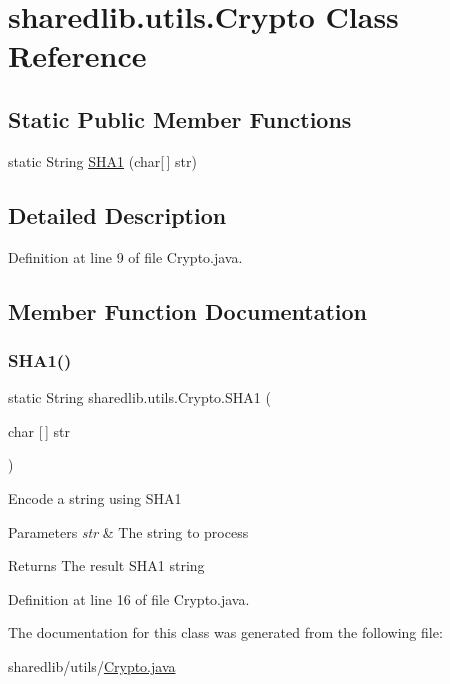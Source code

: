 \hypertarget{classsharedlib_1_1utils_1_1_crypto}{}\section{sharedlib.\+utils.\+Crypto Class Reference}
\label{classsharedlib_1_1utils_1_1_crypto}
\subsection*{Static Public Member Functions}
\begin{DoxyCompactItemize}
\item 
static String \hyperlink{classsharedlib_1_1utils_1_1_crypto_a0284de163e110b85f0b08b75bce3c4ce}{S\+H\+A1} (char\mbox{[}$\,$\mbox{]} str)
\end{DoxyCompactItemize}


\subsection{Detailed Description}


Definition at line 9 of file Crypto.\+java.



\subsection{Member Function Documentation}
\hypertarget{classsharedlib_1_1utils_1_1_crypto_a0284de163e110b85f0b08b75bce3c4ce}{}\label{classsharedlib_1_1utils_1_1_crypto_a0284de163e110b85f0b08b75bce3c4ce} 
\subsubsection{\texorpdfstring{S\+H\+A1()}{SHA1()}}
{\footnotesize\ttfamily static String sharedlib.\+utils.\+Crypto.\+S\+H\+A1 (\begin{DoxyParamCaption}\item[{char \mbox{[}$\,$\mbox{]}}]{str }\end{DoxyParamCaption})\hspace{0.3cm}{\ttfamily [static]}}

Encode a string using S\+H\+A1 
\begin{DoxyParams}{Parameters}
{\em str} & The string to process \\
\hline
\end{DoxyParams}
\begin{DoxyReturn}{Returns}
The result S\+H\+A1 string 
\end{DoxyReturn}


Definition at line 16 of file Crypto.\+java.



The documentation for this class was generated from the following file\+:\begin{DoxyCompactItemize}
\item 
sharedlib/utils/\hyperlink{_crypto_8java}{Crypto.\+java}\end{DoxyCompactItemize}
